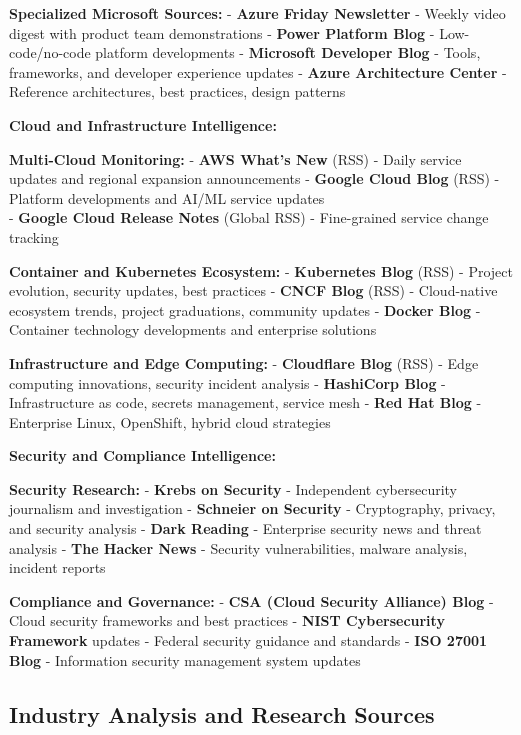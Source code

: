 \documentclass[
  letterpaper,
  DIV=11,
  numbers=noendperiod]{scrartcl}
\begin{document}
\textbf{Specialized Microsoft Sources:} - \textbf{Azure Friday
Newsletter} - Weekly video digest with product team demonstrations -
\textbf{Power Platform Blog} - Low-code/no-code platform developments -
\textbf{Microsoft Developer Blog} - Tools, frameworks, and developer
experience updates - \textbf{Azure Architecture Center} - Reference
architectures, best practices, design patterns

\textbf{Cloud and Infrastructure Intelligence:}

\textbf{Multi-Cloud Monitoring:} - \textbf{AWS What's New} (RSS) - Daily
service updates and regional expansion announcements - \textbf{Google
Cloud Blog} (RSS) - Platform developments and AI/ML service updates\\
- \textbf{Google Cloud Release Notes} (Global RSS) - Fine-grained
service change tracking

\textbf{Container and Kubernetes Ecosystem:} - \textbf{Kubernetes Blog}
(RSS) - Project evolution, security updates, best practices -
\textbf{CNCF Blog} (RSS) - Cloud-native ecosystem trends, project
graduations, community updates - \textbf{Docker Blog} - Container
technology developments and enterprise solutions

\textbf{Infrastructure and Edge Computing:} - \textbf{Cloudflare Blog}
(RSS) - Edge computing innovations, security incident analysis -
\textbf{HashiCorp Blog} - Infrastructure as code, secrets management,
service mesh - \textbf{Red Hat Blog} - Enterprise Linux, OpenShift,
hybrid cloud strategies

\textbf{Security and Compliance Intelligence:}

\textbf{Security Research:} - \textbf{Krebs on Security} - Independent
cybersecurity journalism and investigation - \textbf{Schneier on
Security} - Cryptography, privacy, and security analysis - \textbf{Dark
Reading} - Enterprise security news and threat analysis - \textbf{The
Hacker News} - Security vulnerabilities, malware analysis, incident
reports

\textbf{Compliance and Governance:} - \textbf{CSA (Cloud Security
Alliance) Blog} - Cloud security frameworks and best practices -
\textbf{NIST Cybersecurity Framework} updates - Federal security
guidance and standards - \textbf{ISO 27001 Blog} - Information security
management system updates

\subsection{Industry Analysis and Research
Sources}\label{industry-analysis-and-research-sources}
\end{document}
